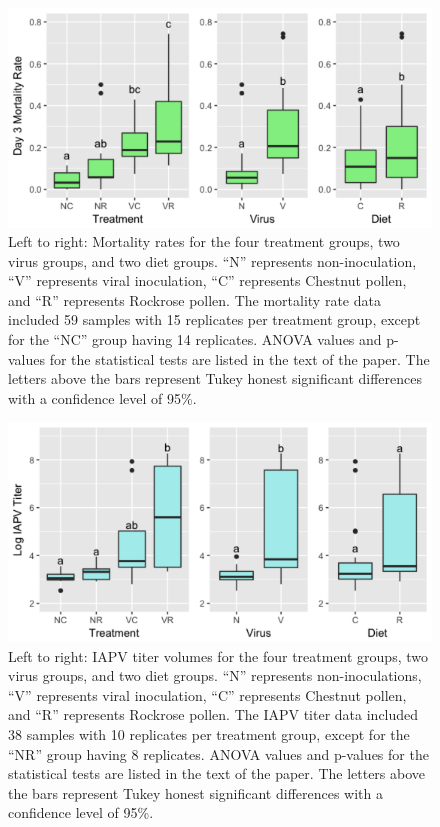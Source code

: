 \documentclass[11pt,a4paper,oldfontcommands,openany]{memoir}
\numberwithin{equation}{section} %
\begin{document}
\begin{figure}[H]
\centering
  \begin{framed}
  \includegraphics[width=\textwidth]{Images/Mortality_Final}
  \end{framed}
  \caption{Left to right: Mortality rates for the four treatment groups, two virus groups, and two diet groups. ``N'' represents non-inoculation, ``V'' represents viral inoculation, ``C'' represents Chestnut pollen, and ``R'' represents Rockrose pollen. The mortality rate data included 59 samples with 15 replicates per treatment group, except for the ``NC'' group having 14 replicates. ANOVA values and p-values for the statistical tests are listed in the text of the paper. The letters above the bars represent Tukey honest significant differences with a confidence level of 95\%.}
  \label{fig:Mortality_Final}
\end{figure}

\begin{figure}[H]
\centering
  \begin{framed}
  \includegraphics[width=\textwidth]{Images/IAPV_Final}
  \end{framed}
  \caption{Left to right: IAPV titer volumes for the four treatment groups, two virus groups, and two diet groups. ``N'' represents non-inoculations, ``V'' represents viral inoculation, ``C'' represents Chestnut pollen, and ``R'' represents Rockrose pollen. The IAPV titer data included 38 samples with 10 replicates per treatment group, except for the ``NR'' group having 8 replicates. ANOVA values and p-values for the statistical tests are listed in the text of the paper. The letters above the bars represent Tukey honest significant differences with a confidence level of 95\%.}
  \label{fig:IAPV_Final}
\end{figure}
\end{document}
